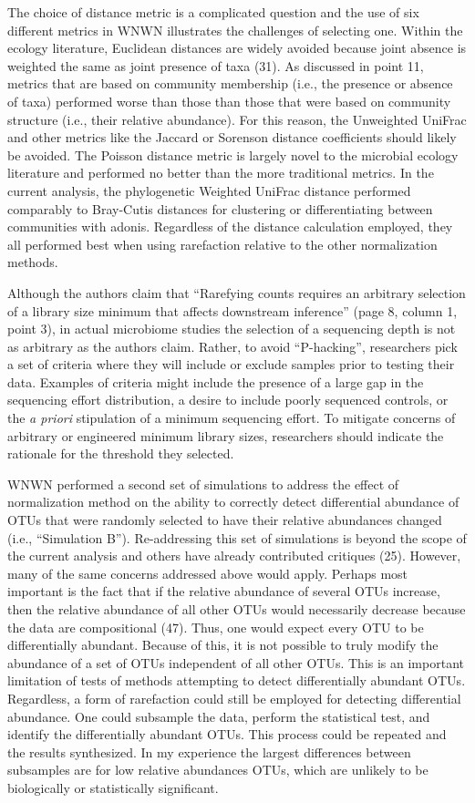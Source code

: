 \documentclass[
]{article}
\begin{document}
The choice of distance metric is a complicated question and the use of
six different metrics in WNWN illustrates the challenges of selecting
one. Within the ecology literature, Euclidean distances are widely
avoided because joint absence is weighted the same as joint presence of
taxa (31). As discussed in point 11, metrics that are based on community
membership (i.e., the presence or absence of taxa) performed worse than
those than those that were based on community structure (i.e., their
relative abundance). For this reason, the Unweighted UniFrac and other
metrics like the Jaccard or Sorenson distance coefficients should likely
be avoided. The Poisson distance metric is largely novel to the
microbial ecology literature and performed no better than the more
traditional metrics. In the current analysis, the phylogenetic Weighted
UniFrac distance performed comparably to Bray-Cutis distances for
clustering or differentiating between communities with adonis.
Regardless of the distance calculation employed, they all performed best
when using rarefaction relative to the other normalization methods.

Although the authors claim that ``Rarefying counts requires an arbitrary
selection of a library size minimum that affects downstream inference''
(page 8, column 1, point 3), in actual microbiome studies the selection
of a sequencing depth is not as arbitrary as the authors claim. Rather,
to avoid ``P-hacking'', researchers pick a set of criteria where they
will include or exclude samples prior to testing their data. Examples of
criteria might include the presence of a large gap in the sequencing
effort distribution, a desire to include poorly sequenced controls, or
the \emph{a priori} stipulation of a minimum sequencing effort. To
mitigate concerns of arbitrary or engineered minimum library sizes,
researchers should indicate the rationale for the threshold they
selected.

WNWN performed a second set of simulations to address the effect of
normalization method on the ability to correctly detect differential
abundance of OTUs that were randomly selected to have their relative
abundances changed (i.e., ``Simulation B''). Re-addressing this set of
simulations is beyond the scope of the current analysis and others have
already contributed critiques (25). However, many of the same concerns
addressed above would apply. Perhaps most important is the fact that if
the relative abundance of several OTUs increase, then the relative
abundance of all other OTUs would necessarily decrease because the data
are compositional (47). Thus, one would expect every OTU to be
differentially abundant. Because of this, it is not possible to truly
modify the abundance of a set of OTUs independent of all other OTUs.
This is an important limitation of tests of methods attempting to detect
differentially abundant OTUs. Regardless, a form of rarefaction could
still be employed for detecting differential abundance. One could
subsample the data, perform the statistical test, and identify the
differentially abundant OTUs. This process could be repeated and the
results synthesized. In my experience the largest differences between
subsamples are for low relative abundances OTUs, which are unlikely to
be biologically or statistically significant.
\end{document}
